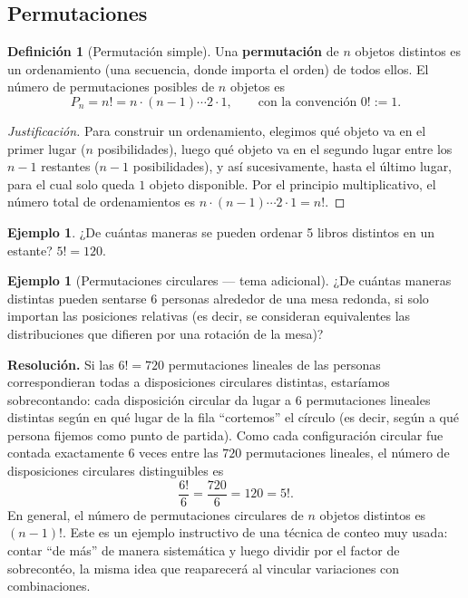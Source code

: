 \documentclass[11pt,a4paper]{article}
\theoremstyle{plain}
\theoremstyle{definition}
\newtheorem{definicion}[teorema]{Definición}
\newtheorem{ejemplo}[teorema]{Ejemplo}
\theoremstyle{remark}
\begin{document}
\subsection{Permutaciones}

\begin{definicion}[Permutación simple]
Una \textbf{permutación} de $n$ objetos distintos es un ordenamiento (una secuencia, donde importa el orden) de todos ellos. El número de permutaciones posibles de $n$ objetos es
\[
P_n = n! = n\cdot(n-1)\cdots 2\cdot 1, \qquad \text{con la convención } 0! := 1.
\]
\end{definicion}

\begin{proof}[Justificación]
Para construir un ordenamiento, elegimos qué objeto va en el primer lugar ($n$ posibilidades), luego qué objeto va en el segundo lugar entre los $n-1$ restantes ($n-1$ posibilidades), y así sucesivamente, hasta el último lugar, para el cual solo queda $1$ objeto disponible. Por el principio multiplicativo, el número total de ordenamientos es $n\cdot(n-1)\cdots 2\cdot 1 = n!$.
\end{proof}

\begin{ejemplo}
¿De cuántas maneras se pueden ordenar 5 libros distintos en un estante? $5! = 120$.
\end{ejemplo}

\begin{ejemplo}[Permutaciones circulares — tema adicional]
¿De cuántas maneras distintas pueden sentarse 6 personas alrededor de una mesa redonda, si solo importan las posiciones relativas (es decir, se consideran equivalentes las distribuciones que difieren por una rotación de la mesa)?
\end{ejemplo}

\textbf{Resolución.} Si las $6! = 720$ permutaciones lineales de las personas correspondieran todas a disposiciones circulares distintas, estaríamos sobrecontando: cada disposición circular da lugar a $6$ permutaciones lineales distintas según en qué lugar de la fila ``cortemos'' el círculo (es decir, según a qué persona fijemos como punto de partida). Como cada configuración circular fue contada exactamente $6$ veces entre las $720$ permutaciones lineales, el número de disposiciones circulares distinguibles es
\[
\frac{6!}{6} = \frac{720}{6} = 120 = 5!.
\]
En general, el número de permutaciones circulares de $n$ objetos distintos es $(n-1)!$. Este es un ejemplo instructivo de una técnica de conteo muy usada: contar ``de más'' de manera sistemática y luego dividir por el factor de sobrecontéo, la misma idea que reaparecerá al vincular variaciones con combinaciones.
\end{document}
